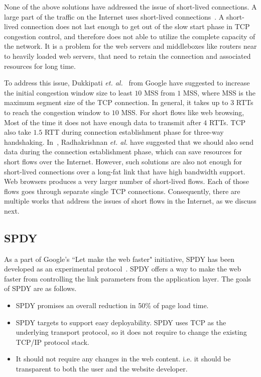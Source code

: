 None of the above solutions have addressed the issue of short-lived connections. A large part of the traffic on the Internet uses short-lived connections~\cite{kheirkhah2015short}. A short-lived connection does not last enough to get out of the slow start phase in TCP congestion control, and therefore does not able to utilize the complete capacity of the network. It is a problem for the web servers and middleboxes like routers near to heavily loaded web servers, that need to retain the connection and associated resources for long time. 

To address this issue, Dukkipati \textit{et. al.}~\cite{google-long-initcwnd} from Google have suggested to increase the initial congestion window size to least $10$ MSS from $1$ MSS, where MSS is the maximum segment size of the TCP connection. In general, it takes up to $3$ RTTs to reach the congestion window to $10$ MSS. For short flows like web browsing, Most of the time it does not have enough data to transmit after $4$ RTTs. TCP also take $1.5$ RTT during connection establishment phase for three-way handshaking. In~\cite{google-fast-open}, Radhakrishnan \textit{et. al.} have suggested that we should also send data during the connection establishment phase, which can save resources for short flows over the Internet. However, such solutions are also not enough for short-lived connections over a long-fat link that have high bandwidth support. Web browsers produces a very larger number of short-lived flows. Each of those flows goes through separate single TCP connections. Consequently, there are multiple works that address the issues of short flows in the Internet, as we discuss next.

\subsection{SPDY}
As a part of Google's ``Let make the web faster" initiative, SPDY has been developed as an experimental protocol~\cite{spdy}. SPDY offers a way to make the web faster from controlling the link parameters from the application layer. The goals of SPDY are as follows.
\begin{itemize}
    \item SPDY promises an overall reduction in 50\% of page load time.
    \item SPDY targets to support easy deployability. SPDY uses TCP as the underlying transport protocol, so it does not require to change the existing TCP/IP protocol stack.
    \item It should not require any changes in the web content. i.e. it should be transparent to both the user and the website developer.
\end{itemize}

